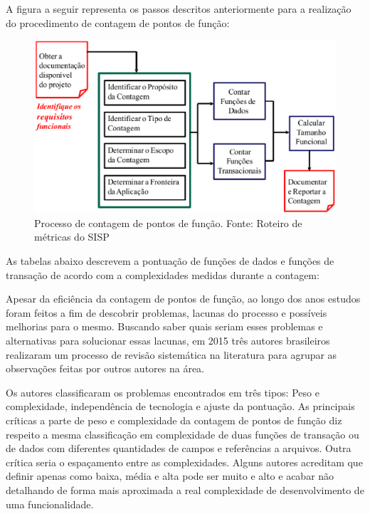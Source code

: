 A figura a seguir representa os passos descritos anteriormente para a realização do procedimento de contagem de pontos de função:

\begin{figure}[h]
	\centering
	\label{fig04}
		\includegraphics[keepaspectratio=true,scale=0.4]{figuras/fig04.eps}
	\caption{Processo de contagem de pontos de função. Fonte: Roteiro de métricas do SISP}
\end{figure}


As tabelas abaixo descrevem a pontuação de funções de dados e funções de transação de acordo com a complexidades medidas durante a contagem:





Apesar da eficiência da contagem de pontos de função, ao longo dos anos estudos foram feitos a fim de descobrir problemas, lacunas do processo e possíveis melhorias para o mesmo. Buscando saber quais seriam esses problemas e alternativas para solucionar essas lacunas, em 2015 três autores brasileiros realizaram um processo de revisão sistemática na literatura para agrupar as observações feitas por outros autores na área.

Os autores classificaram os problemas encontrados em três tipos: Peso e complexidade, independência de tecnologia e ajuste da pontuação. As principais críticas a parte de peso e complexidade da contagem de pontos de função diz respeito a mesma classificação em complexidade de duas funções de transação ou de dados com diferentes quantidades de campos e referências a arquivos. Outra crítica seria o espaçamento entre as complexidades. Alguns autores acreditam que definir apenas como baixa, média e alta pode ser muito e alto e acabar não detalhando de forma mais aproximada a real complexidade de desenvolvimento de uma funcionalidade.

